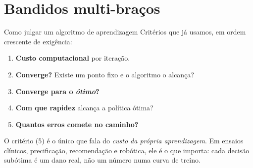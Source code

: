 \documentclass[aspectratio=169, 10pt]{beamer}
\begin{document}
\section{Bandidos multi-braços}

\begin{frame}{Como julgar um algoritmo de aprendizagem}
  Critérios que já usamos, em ordem crescente de exigência:
  \begin{enumerate}
    \item \textbf{Custo computacional} por iteração.
    \item \textbf{Converge?} Existe um ponto fixo e o algoritmo o alcança?
    \item \textbf{Converge para o \emph{ótimo}?}
    \item \textbf{Com que rapidez} alcança a política ótima?
    \item \alert{\textbf{Quantos erros comete no caminho?}}
  \end{enumerate}

  \bigskip
  \begin{alertabox}
    O critério (5) é o único que fala do \emph{custo da própria
    aprendizagem}. Em ensaios clínicos, precificação, recomendação e
    robótica, ele é o que importa: cada decisão subótima é um dano real,
    não um número numa curva de treino.
  \end{alertabox}
\end{frame}
\end{document}
